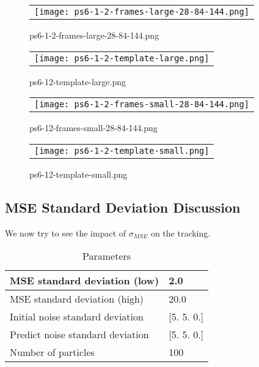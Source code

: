 \documentclass[a4paper,11pt]{article}
\begin{document}
\begin{figure}[H]
\begin{center}
\begin{tabular}{c}
	\texttt{[image: ps6-1-2-frames-large-28-84-144.png]}\\
\end{tabular}
\end{center}
\caption{ps6-1-2-frames-large-28-84-144.png}
\label{ps-6-2-a}
\end{figure}


\begin{figure}[H]
\begin{center}
\begin{tabular}{c}
	\texttt{[image: ps6-1-2-template-large.png]}\\
\end{tabular}
\end{center}
\caption{ ps6-12-template-large.png}
\label{ps-6-2-b}
\end{figure}


\begin{figure}[H]
\begin{center}
\begin{tabular}{c}
	\texttt{[image: ps6-1-2-frames-small-28-84-144.png]}\\
\end{tabular}
\end{center}
\caption{ps6-12-frames-small-28-84-144.png}
\label{ps-6-2-c}
\end{figure}


\begin{figure}[H]
\begin{center}
\begin{tabular}{c}
	\texttt{[image: ps6-1-2-template-small.png]}\\
\end{tabular}
\end{center}
\caption{ps6-12-template-small.png}
\label{ps-6-2-d}
\end{figure}


\subsection{MSE Standard Deviation Discussion}

We now try to see the impact of $\sigma_{MSE}$ on the tracking.

\begin{table}[H]
\centering
\caption{Parameters}
\begin{tabular}{|l|l|}
\hline
MSE standard deviation (low)          & 2.0           \\ \hline
MSE standard deviation  (high)         & 20.0           \\ \hline
Initial noise standard deviation & {[}5. 5. 0.{]} \\ \hline
Predict noise standard deviation & {[}5. 5. 0.{]} \\ \hline
Number of particles              & 100            \\ \hline
\end{tabular}
\end{table}
\end{document}
